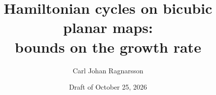\documentclass[11pt]{article}
\begin{document}
\title{Hamiltonian cycles on bicubic planar maps:\\ bounds on the growth rate}
\author{Carl Johan Ragnarsson}
\date{Draft of October 25, 2026}
\maketitle








\clearpage
\appendix




\end{document}
